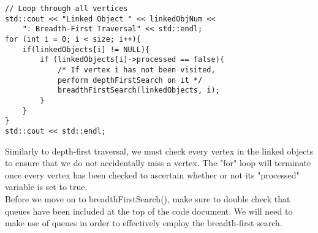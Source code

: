 \documentclass{article}
\begin{document}
\begin{lstlisting}
// Loop through all vertices
std::cout << "Linked Object " << linkedObjNum << 
    ": Breadth-First Traversal" << std::endl;
for (int i = 0; i < size; i++){
    if(linkedObjects[i] != NULL){
        if (linkedObjects[i]->processed == false){
            /* If vertex i has not been visited, 
            perform depthFirstSearch on it */
            breadthFirstSearch(linkedObjects, i);
        }
    }
}
std::cout << std::endl;
\end{lstlisting}
Similarly to depth-first traversal, we must check every vertex in the linked objects to ensure that we do not accidentally miss a vertex. The "for" loop will terminate once every vertex has been checked to ascertain whether or not its "processed" variable is set to true. \\
Before we move on to breadthFirstSearch(), make sure to double check that queues have been included at the top of the code document. We will need to make use of queues in order to effectively employ the breadth-first search.

\pagebreak
\end{document}
